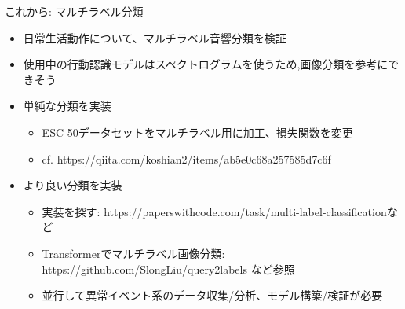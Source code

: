 \documentclass[unicode,12pt,aspectratio=169,dvipdfmx]{beamer}
\begin{document}
\begin{frame}{これから: マルチラベル分類}
\begin{itemize}
    \item 日常生活動作について、マルチラベル音響分類を検証
    \item 使用中の行動認識モデルはスペクトログラムを使うため,画像分類を参考にできそう
    \item 単純な分類を実装
    \begin{itemize}
        \item ESC-50データセットをマルチラベル用に加工、損失関数を変更
        \item cf. https://qiita.com/koshian2/items/ab5e0c68a257585d7c6f
    \end{itemize}
    \item より良い分類を実装
    \begin{itemize}
        \item 実装を探す: https://paperswithcode.com/task/multi-label-classificationなど
        \item Transformerでマルチラベル画像分類: https://github.com/SlongLiu/query2labels など参照
        \item 並行して異常イベント系のデータ収集/分析、モデル構築/検証が必要
    \end{itemize}
\end{itemize}
\end{frame}
\end{document}
